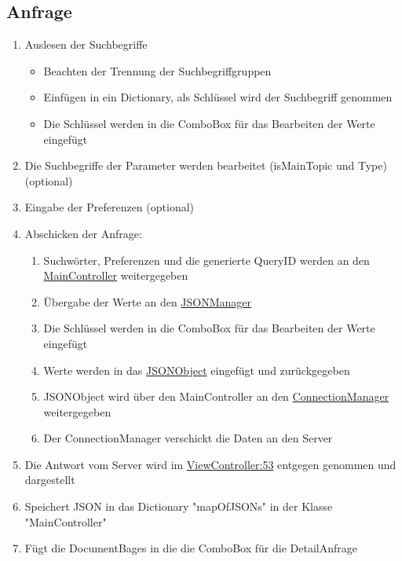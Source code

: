 \subsection{Anfrage}
\begin{enumerate}
  \item Auslesen der Suchbegriffe
    \begin{itemize}
      \item Beachten der Trennung der Suchbegriffgruppen
      \item Einfügen in ein Dictionary, als Schlüssel wird der Suchbegriff genommen
      \item Die Schlüssel werden in die ComboBox für das Bearbeiten der Werte eingefügt
    \end{itemize}
  \item Die Suchbegriffe der Parameter werden bearbeitet (isMainTopic und Type) (optional)
  \item Eingabe der Preferenzen (optional)
  \item Abschicken der Anfrage:
    \begin{enumerate}
      \item Suchwörter, Preferenzen und die generierte QueryID werden an den \href{https://github.com/SECH-Tag-EEXCESS-Browser/iOSX-App/blob/master/Team%20Content/Demos/JSON/Sech/Sech/MainController.swift}{MainController} weitergegeben
      \item Übergabe der Werte an den \href{https://github.com/SECH-Tag-EEXCESS-Browser/iOSX-App/blob/master/Team%20Content/Demos/JSON/Sech/Sech/JSONManager.swift}{JSONManager}
      \item Die Schlüssel werden in die ComboBox für das Bearbeiten der Werte eingefügt
      \item Werte werden in das \href{https://github.com/SECH-Tag-EEXCESS-Browser/iOSX-App/blob/master/Team%20Content/Demos/JSON/Sech/Sech/Json.swift}{JSONObject} eingefügt und zurückgegeben
      \item JSONObject wird über den MainController an den \href{https://github.com/SECH-Tag-EEXCESS-Browser/iOSX-App/blob/master/Team%20Content/Demos/JSON/Sech/Sech/ConnectionManager.swift}{ConnectionManager} weitergegeben
      \item Der ConnectionManager verschickt die Daten an den Server
    \end{enumerate}
  \item Die Antwort vom Server wird im \href{https://github.com/SECH-Tag-EEXCESS-Browser/iOSX-App/blob/master/Team%20Content/Demos/JSON/Sech/Sech/ViewController.swift}{ViewController:53} entgegen genommen und dargestellt
  \item Speichert JSON in das Dictionary "mapOfJSONs" in der Klasse "MainController"
  \item Fügt die DocumentBages in die die ComboBox für die DetailAnfrage
\end{enumerate}
\pagebreak
